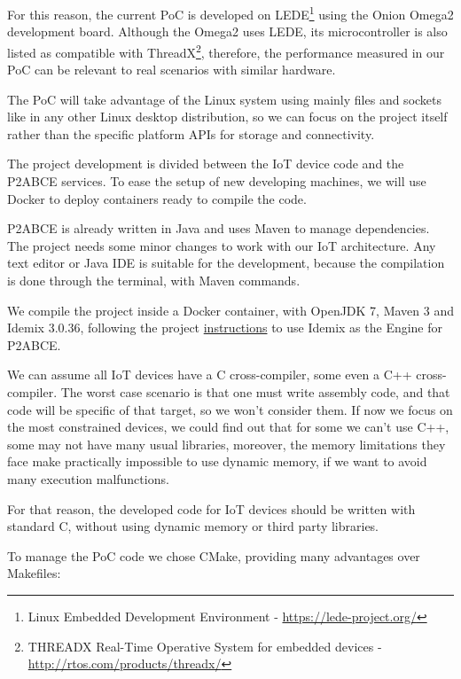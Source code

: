 For this reason, the current \ac{PoC} is developed on LEDE\footnote{Linux Embedded Development Environment - \url{https://lede-project.org/}} using the Onion Omega2 development board. Although the Omega2 uses LEDE, its microcontroller is also listed as compatible with ThreadX\footnote{THREADX Real-Time Operative System for embedded devices - \url{http://rtos.com/products/threadx/}}, therefore, the performance measured in our PoC can be relevant to real scenarios with similar hardware.

The PoC will take advantage of the Linux system using mainly files and sockets like in any other Linux desktop distribution, so we can focus on the project itself rather than the specific platform APIs for storage and connectivity.


\hfil

The project development is divided between the IoT device code and the P2ABCE services. To ease the setup of new developing machines, we will use Docker to deploy containers ready to compile the code.

\hfil

P2ABCE is already written in Java and uses Maven to manage dependencies. The project needs some minor changes to work with our IoT architecture. Any text editor or Java IDE is suitable for the development, because the compilation is done through the terminal, with Maven commands.

We compile the project inside a Docker container, with OpenJDK 7, Maven 3 and Idemix 3.0.36, following the project \href{https://github.com/p2abcengine/p2abcengine/wiki/How-to-Build-the-ABC-Engine}{instructions} to use Idemix as the Engine for P2ABCE.

\hfil

We can assume all IoT devices have a C cross-compiler, some even a C++ cross-compiler. The worst case scenario is that one must write assembly code, and that code will be specific of that target, so we won't consider them.
If now we focus on the most constrained devices, we could find out that for some we can't use C++, some may not have many usual libraries, moreover, the memory limitations they face make practically impossible to use dynamic memory, if we want to avoid many execution malfunctions.

For that reason, the developed code for IoT devices should be written with standard C, without using dynamic memory or third party libraries.

\hfil


To manage the PoC code we chose CMake, providing many advantages over Makefiles:

